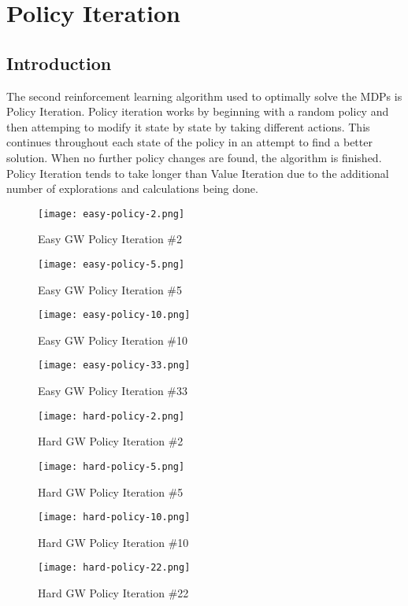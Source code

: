 \documentclass[h]{article}
\begin{document}
 
\section*{Policy Iteration}
\subsection*{Introduction}
The second reinforcement learning algorithm used to optimally solve the MDPs is 
Policy Iteration.  Policy iteration works by beginning with a random policy and then 
attemping to modify it state by state by taking different actions.  This continues throughout each state of the policy in an attempt
 to find a better solution.  When no further policy changes are found, the algorithm 
 is finished.  Policy Iteration tends to take longer than Value Iteration due to 
 the additional number of explorations and calculations being done.
 
 
    \begin{figure}[H]
      \texttt{[image: easy-policy-2.png]} 
      \caption*{Easy GW Policy Iteration \#2} 
   \endminipage\hfill
      \texttt{[image: easy-policy-5.png]} 
      \caption*{Easy GW Policy Iteration \#5} 
   \endminipage\hfill
      \texttt{[image: easy-policy-10.png]} 
      \caption*{Easy GW Policy Iteration \#10} 
   \endminipage\hfill
      \texttt{[image: easy-policy-33.png]} 
      \caption*{Easy GW Policy Iteration \#33} 
   \endminipage\hfill
\end{figure}


   \begin{figure}[H]
      \texttt{[image: hard-policy-2.png]} 
      \caption*{Hard GW Policy Iteration \#2} 
   \endminipage\hfill
      \texttt{[image: hard-policy-5.png]} 
      \caption*{Hard GW Policy Iteration \#5} 
   \endminipage\hfill
      \texttt{[image: hard-policy-10.png]} 
      \caption*{Hard GW Policy Iteration \#10} 
   \endminipage\hfill
      \texttt{[image: hard-policy-22.png]} 
      \caption*{Hard GW Policy Iteration \#22} 
   \endminipage\hfill
\end{figure}
\end{document}

